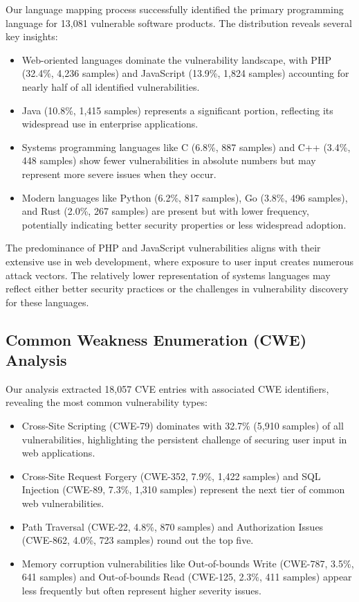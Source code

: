 Our language mapping process successfully identified the primary programming language for 13,081 vulnerable software products. The distribution reveals several key insights:

\begin{itemize}
    \item Web-oriented languages dominate the vulnerability landscape, with PHP (32.4\%, 4,236 samples) and JavaScript (13.9\%, 1,824 samples) accounting for nearly half of all identified vulnerabilities.
    \item Java (10.8\%, 1,415 samples) represents a significant portion, reflecting its widespread use in enterprise applications.
    \item Systems programming languages like C (6.8\%, 887 samples) and C++ (3.4\%, 448 samples) show fewer vulnerabilities in absolute numbers but may represent more severe issues when they occur.
    \item Modern languages like Python (6.2\%, 817 samples), Go (3.8\%, 496 samples), and Rust (2.0\%, 267 samples) are present but with lower frequency, potentially indicating better security properties or less widespread adoption.
\end{itemize}

The predominance of PHP and JavaScript vulnerabilities aligns with their extensive use in web development, where exposure to user input creates numerous attack vectors. The relatively lower representation of systems languages may reflect either better security practices or the challenges in vulnerability discovery for these languages.

\subsection{Common Weakness Enumeration (CWE) Analysis}

Our analysis extracted 18,057 CVE entries with associated CWE identifiers, revealing the most common vulnerability types:

\begin{itemize}
    \item Cross-Site Scripting (CWE-79) dominates with 32.7\% (5,910 samples) of all vulnerabilities, highlighting the persistent challenge of securing user input in web applications.
    \item Cross-Site Request Forgery (CWE-352, 7.9\%, 1,422 samples) and SQL Injection (CWE-89, 7.3\%, 1,310 samples) represent the next tier of common web vulnerabilities.
    \item Path Traversal (CWE-22, 4.8\%, 870 samples) and Authorization Issues (CWE-862, 4.0\%, 723 samples) round out the top five.
    \item Memory corruption vulnerabilities like Out-of-bounds Write (CWE-787, 3.5\%, 641 samples) and Out-of-bounds Read (CWE-125, 2.3\%, 411 samples) appear less frequently but often represent higher severity issues.
\end{itemize}

